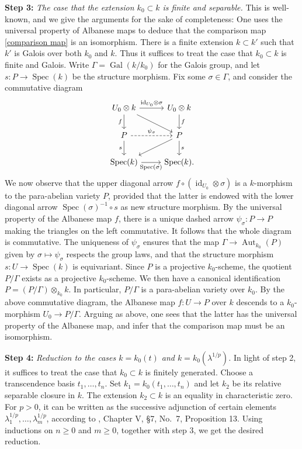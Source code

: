 \documentclass[oneside, 12pt]{amsart}
\theoremstyle{definition}
\theoremstyle{remark}
\newcommand{\Aut}{\operatorname{Aut}}
\newcommand{\Gal}{\operatorname{Gal}}
\newcommand{\id}{{\operatorname{id}}}
\newcommand{\ra}{\rightarrow}
\newcommand{\Spec}{\operatorname{Spec}}
\begin{document}
\medskip
{\bf Step 3:}
\emph{The case that the extension $k_0\subset k$ is  finite and  separable.}
This   is well-known, and we give the  arguments   for the sake of completeness:
One uses the universal property of Albanese maps to  deduce that the comparison map \eqref{comparison map} is an isomorphism.
There is a  finite extension $k\subset k'$ such that $k'$ is  Galois over both $k_0$ and $k$.
Thus it suffices to treat the case that $k_0\subset k$ is finite and  Galois. Write  $\Gamma=\Gal(k/k_0)$ for     the  Galois group, and let
$s:P\ra\Spec(k)$ be the structure morphism.
Fix some $\sigma\in \Gamma$, and consider the commutative diagram
$$
\begin{tikzcd} 
U_0\otimes k\ar[r,"\id_{U_0}\otimes \sigma"]\ar[d,"f"']\ar[dr]	& U_0\otimes k\ar[d,"f"]\\
P\ar[d,"s"']\ar[r,dashed,"\psi_\sigma"]		&  P\ar[d,"s"]\ar[dl]\\
\Spec(k)\ar[r,"\Spec(\sigma)"']		& \Spec(k).
\end{tikzcd}
$$
We now observe that the upper diagonal arrow $f\circ (\id_{U_0}\otimes\sigma)$ is a $k$-morphism
to the para-abelian variety $P$, provided that the latter is endowed with     the lower diagonal arrow $\Spec(\sigma)^{-1}\circ s$ as new structure morphism.
By the universal property of the Albanese map $f$, there is a unique dashed arrow
$\psi_\sigma:P\ra P$ making the triangles on the left commutative. 
It follows that the whole diagram is commutative. The uniqueness of $\psi_\sigma$ ensures that
the map $\Gamma\ra\Aut_{k_0}(P)$ given by $\sigma\mapsto \psi_\sigma$ respects the group laws,
and that the structure morphism $s:U\ra\Spec(k)$ is equivariant.
Since $P$ is a projective $k_0$-scheme,   the quotient $P/\Gamma$ exists as a projective $k_0$-scheme. 
We then have a canonical identification $P=(P/\Gamma)\otimes_{k_0}k$.
In particular, $P/\Gamma$ is a para-abelian variety over $k_0$.
By the above commutative diagram, the Albanese map $f:U\ra P$ over $k$ descends to a $k_0$-morphism $ U_0\ra P/\Gamma$.
Arguing as above, one sees that the latter has the universal property of the Albanese map, and infer that the comparison map must be an isomorphism.

  
\medskip
{\bf Step 4:}
\emph{Reduction to the cases $k=k_0(t)$ and $k=k_0(\lambda^{1/p})$.}
In light of step 2, it suffices to treat the case that $k_0\subset k$ is finitely generated.
Choose a transcendence basis $t_1,\ldots,t_n$.  Set $k_1=k_0(t_1,\ldots,t_n)$ and let $k_2$ be its relative separable closure in $k$.
The extension $k_2\subset k$ is an equality in characteristic zero. For $p>0$, it can be written
as the successive adjunction 
of certain elements $\lambda_1^{1/p},\ldots,\lambda_m^{1/p}$, according to \cite{A 4-7}, Chapter V, \S7, No.\ 7, Proposition 13.
Using inductions on $n\geq0$ and $m\geq 0$, together with step 3, we get the desired reduction.
\end{document}

